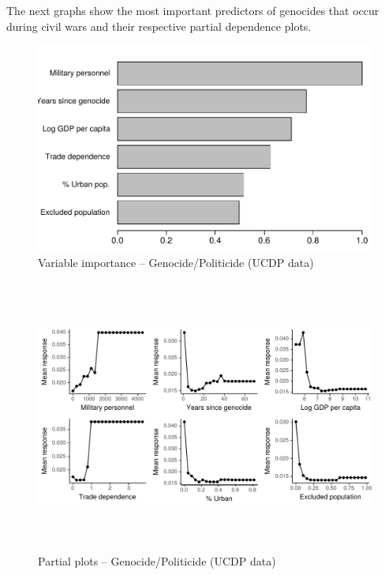 \newpage

The next graphs show the most important predictors of genocides that occur during civil wars and their respective partial dependence plots. 

\begin{figure}[H]
    \centering
    \includegraphics{images/drf-gp1.pdf}
    \caption{Variable importance -- Genocide/Politicide (UCDP data)}
    \label{fig:my_label}
\end{figure}

\begin{figure}[H]
    \centering
    \includegraphics[width=\textwidth, height=9cm]{images/drfdpp5a.pdf}
    \caption{Partial plots -- Genocide/Politicide (UCDP data)}
    \label{fig:my_label}
\end{figure}

